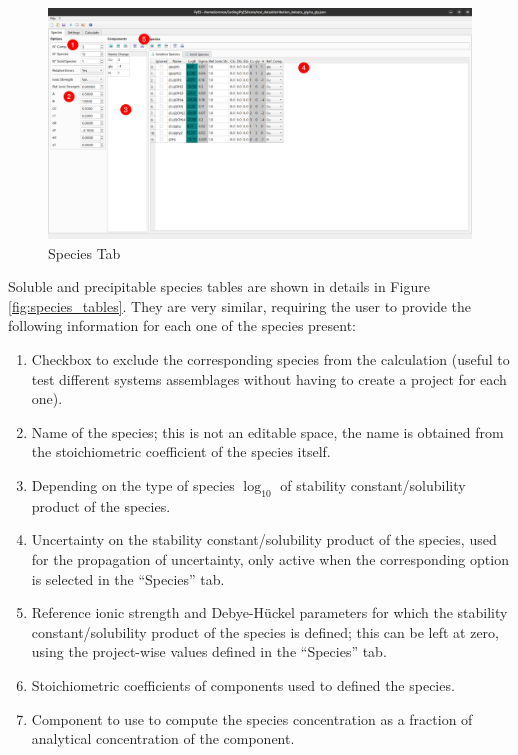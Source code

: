 \documentclass[a4paper, 12pt]{article}
\newcommand*\circled[1]{\kern-2.5em%
  \put(0,4){\color{red}\circle*{18}}\put(0,4){\circle{16}}%
  \put(-4,0){\color{white}\bfseries\large#1}~~}
\begin{document}
\begin{figure}[h]
	\centering
	\includegraphics[width=\textwidth]{img/species.png}
	\caption{Species Tab}
    \label{fig:species}
\end{figure}

Soluble and precipitable species tables are shown in details in Figure \ref*{fig:species_tables}.
They are very similar, requiring the user to provide the following information for each one of the species present:

\begin{enumerate}[label=\protect\circled{\arabic*}]
    \item Checkbox to exclude the corresponding species from the calculation (useful to test different systems assemblages without having to create a project for each one).
    \item Name of the species; this is not an editable space, the name is obtained from the stoichiometric coefficient of the species itself.
    \item Depending on the type of species $\log_{10}$ of stability constant/solubility product of the species.
    \item Uncertainty on the stability constant/solubility product of the species, used for the propagation of uncertainty, only active when the corresponding option is selected in the ``Species'' tab.
    \item Reference ionic strength and Debye-H\"uckel parameters for which the stability constant/solubility product of the species is defined; this can be left at zero, using the project-wise values defined in the ``Species'' tab.
    \item Stoichiometric coefficients of components used to defined the species.
    \item Component to use to compute the species concentration as a fraction of analytical concentration of the component. 
\end{enumerate}
\end{document}
